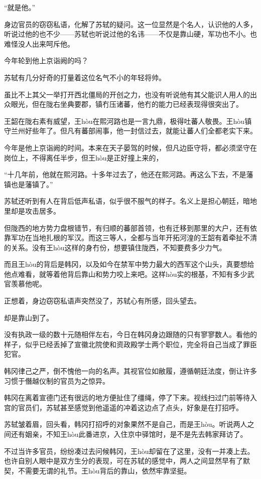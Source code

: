 “就是他。”

身边官员的窃窃私语，化解了苏轼的疑问。这一位显然是个名人，认识他的人多，听说过他的也不少——苏轼也听说过他的名讳——不仅是靠山硬，军功也不小。也难怪没人出来呵斥他。

今年轮到他上京诣阙的吗？

苏轼有几分好奇的打量着这位名气不小的年轻将帅。

虽比不上其父一举打开西北僵局的开创之力，也没有听说他有其父能识人用人的出众眼光，但在陇右坐典要郡，镇冇压诸蕃，他冇的能力已经表现得很突出了。

王韶在陇右素有威望，王hòu在熙河路也是一言九鼎，极得吐蕃人敬畏。王hòu镇守兰州好些年了。但凡有蕃部闹事，他一封信过去，就能让蕃人们全都老实下来。

今年是他上京诣阙的时间。本来在天子晏驾的时候，但凡边臣守将，都必须坚守在岗位上，不得离任半步，但王hòu是正好撞上来的，

“十几年前，他就在熙河路。十多年过去了，他还在熙河路。再这么下去，不是藩镇也是藩镇了。”

苏轼还听到有人在背后低声私语，似乎很不服气的样子。名义上是担心朝廷，暗地里却是攻击居多。

但陇西的地方势力盘根错节，有归顺的蕃部首领，也有迁移到那里的大户，还有依靠军功在当地扎根的军汉。而这三等人，全都与当年开拓河湟的王韶有着牵扯不清的关系。没有王hòu这样的身冇份，想要镇住陇西，不知要费多少力气。

而且王hòu的背后是韩冈，以及如今在禁军中势力最大的西军这个山头，真要想给他点难看，就等着他背后靠山和势力咬上来吧。这样hòu实的根基，不知有多少武官羡慕他呢。

正想着，身边窃窃私语声突然没了，苏轼心有所感，回头望去。

却是靠山到了。

没有执政一级的数十元随相伴左右，今日在韩冈身边跟随的只有寥寥数人。看他的样子，似乎已经丢掉了宣徽北院使和资政殿学士两个职位，完全将自己当成了罪臣犯官。

韩冈律己之严，倒不愧他一向的名声。其视官位如敝履，遵循朝廷法度，倒让许多习惯于僭越仪制的官员为之惊异。

韩冈在离着宣德门还有很远的地方便扯住了缰绳，停了下来。视线扫过门前等待入宫的官员们，苏轼甚至感觉到他遥遥的冲着这边点了点头，好象是在打招呼。

苏轼皱着眉，回头看，韩冈打招呼的对象果然不是自己，而是王hòu。听说两人之间还有姻亲，不知王hòu此番进京，入住京中驿馆时，是不是先去韩家拜访了。

不过当许多官员，纷纷凑过去问候韩冈，王hòu却留在了这里，没有一并凑上去。也许自别人眼中是双方生分的表现，可在苏轼的感觉中，两人之间显然早有了默契，不需要无谓的礼节。王hòu背后的靠山，依然牢靠坚挺。

